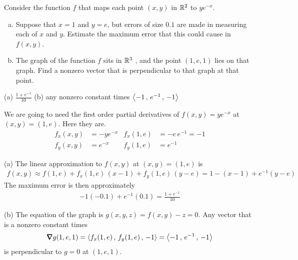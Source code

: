 \begin{question}[M200 2007A] %
Consider the function $f$ that maps each point $(x, y)$ in $\mathbb{R}^2$ 
to $ye^{-x}$.
\begin{enumerate}[(a)]
\item
 Suppose that $x = 1$ and $y = e$, but errors of size $0.1$ are 
made in measuring each of $x$ and $y$. Estimate the maximum error 
that this could cause in $f(x,y)$.

\item
 The graph of the function $f$ sits in $\mathbb{R}^3$ , and the point $(1, e, 1)$ 
lies on that graph. Find a nonzero vector that is perpendicular to that 
graph at that point.
\end{enumerate}
\end{question}

%

\begin{answer}
 (a) $\frac{1+e^{-1}}{10}$\qquad
 (b) any nonzero constant times $\left< -1\,,\,e^{-1}\,,\,-1\right>$
\end{answer}

\begin{solution}
We are going to need the first order partial derivatives of 
$f(x,y)=ye^{-x}$ at $(x,y)=(1,e)$. Here they are.
\begin{align*}
f_x(x,y)&= -ye^{-x} & f_x(1,e)&=-e\,e^{-1}=-1 \\
f_y(x,y)&=e^{-x}    & f_y(1,e)&= e^{-1}
\end{align*}

(a) The linear approximation to $f(x,y)$ at $(x,y)=(1,e)$ is
\begin{align*}
f(x,y) \approx f(1,e) + f_x(1,e)\,(x-1) +f_y(1,e)\,(y-e)
       = 1 -(x-1) +e^{-1}(y-e)
\end{align*}
The maximum error is then approximately
\begin{align*}
-1(-0.1) +e^{-1}(0.1) =\frac{1+e^{-1}}{10}
\end{align*}

(b) The equation of the graph is $g(x,y,z) = f(x,y) -z =0$.
Any vector that is a nonzero constant times 
\begin{align*}
\vnabla g(1,e,1) =\llt f_x(1,e)\,,\,f_y(1,e)\,,\,-1\rgt
                 =\llt -1\,,\,e^{-1}\,,\,-1\rgt
\end{align*}
is perpendicular to $g=0$ at $(1,e,1)$.
\end{solution}

